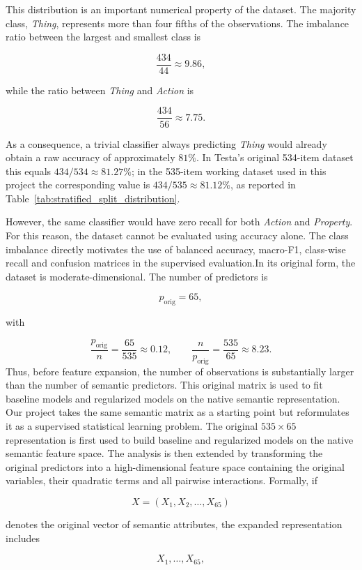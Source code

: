 \documentclass{ipgpmaster}
\begin{document}
This distribution is an important numerical property of the dataset. The majority class, \emph{Thing}, represents more than four fifths of the observations. The imbalance ratio between the largest and smallest class is

\[
\frac{434}{44} \approx 9.86,
\]

while the ratio between \emph{Thing} and \emph{Action} is

\[
\frac{434}{56} \approx 7.75.
\]

As a consequence, a trivial classifier always predicting \emph{Thing} would already obtain a raw accuracy of approximately \(81\%\). In Testa's original 534-item dataset this equals \(434/534 \approx 81.27\%\); in the 535-item working dataset used in this project the corresponding value is \(434/535 \approx 81.12\%\), as reported in Table~\ref{tab:stratified_split_distribution}.

However, the same classifier would have zero recall for both \emph{Action} and \emph{Property}. For this reason, the dataset cannot be evaluated using accuracy alone. The class imbalance directly motivates the use of balanced accuracy, macro-F1, class-wise recall and confusion matrices in the supervised evaluation.In its original form, the dataset is moderate-dimensional. The number of predictors is

\[
p_{\text{orig}} = 65,
\]

with

\[
\frac{p_{\text{orig}}}{n} = \frac{65}{535} \approx 0.12,
\qquad
\frac{n}{p_{\text{orig}}} = \frac{535}{65} \approx 8.23.
\]
Thus, before feature expansion, the number of observations is substantially larger than the number of semantic predictors. This original matrix is used to fit baseline models and regularized models on the native semantic representation. Our project takes the same semantic matrix as a starting point but reformulates it as a supervised statistical learning problem. The original \(535 \times 65\) representation is first used to build baseline and regularized models on the native semantic feature space. The analysis is then extended by transforming the original predictors into a high-dimensional feature space containing the original variables, their quadratic terms and all pairwise interactions.
Formally, if

\[
X = (X_1, X_2, \ldots, X_{65})
\]

denotes the original vector of semantic attributes, the expanded representation includes

\[
X_1,\ldots,X_{65},
\]
\end{document}
